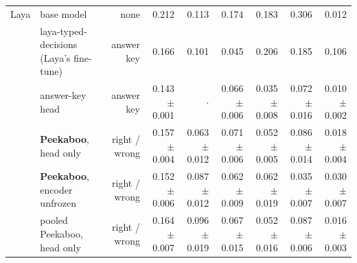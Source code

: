 \begin{table}[tbp]
{\begin{tabular}{llrrrrrrr}
\addlinespace
Laya & base model & none & 0.212 & 0.113 & 0.174 & 0.183 & 0.306 & 0.012 \\
 & laya-typed-decisions (Laya's fine-tune) & answer key & 0.166 & 0.101 & 0.045 & 0.206 & 0.185 & 0.106 \\
 & answer-key head & answer key & 0.143 {\scriptsize$\pm$0.001} & $\cdot$ & 0.066 {\scriptsize$\pm$0.006} & 0.035 {\scriptsize$\pm$0.008} & 0.072 {\scriptsize$\pm$0.016} & 0.010 {\scriptsize$\pm$0.002} \\
 & \textbf{Peekaboo}, head only & right / wrong & 0.157 {\scriptsize$\pm$0.004} & 0.063 {\scriptsize$\pm$0.012} & 0.071 {\scriptsize$\pm$0.006} & 0.052 {\scriptsize$\pm$0.005} & 0.086 {\scriptsize$\pm$0.014} & 0.018 {\scriptsize$\pm$0.004} \\
 & \textbf{Peekaboo}, encoder unfrozen & right / wrong & 0.152 {\scriptsize$\pm$0.006} & 0.087 {\scriptsize$\pm$0.012} & 0.062 {\scriptsize$\pm$0.009} & 0.062 {\scriptsize$\pm$0.019} & 0.035 {\scriptsize$\pm$0.007} & 0.030 {\scriptsize$\pm$0.007} \\
 & pooled Peekaboo, head only & right / wrong & 0.164 {\scriptsize$\pm$0.007} & 0.096 {\scriptsize$\pm$0.019} & 0.067 {\scriptsize$\pm$0.015} & 0.052 {\scriptsize$\pm$0.016} & 0.087 {\scriptsize$\pm$0.006} & 0.016 {\scriptsize$\pm$0.003} \\
\bottomrule
\end{tabular}}
\end{table}

